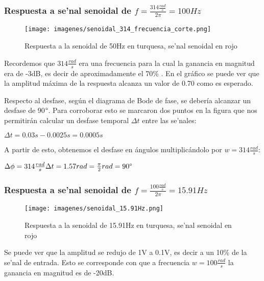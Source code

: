 \documentclass[12pt, titlepage]{article}
\begin{document}
    \newpage
    
    \subsubsection{Respuesta a se'nal senoidal de $f = \frac{314\frac{rad}{s}}{2\pi} = 100Hz$}
    
    \begin{figure}[!htb]
    \texttt{[image: imagenes/senoidal\_314\_frecuencia\_corte.png]}
    \centering
    \caption{Respuesta a la senoidal de 50Hz en turquesa, se'nal senoidal en rojo}
    \end{figure}
    
    Recordemos que $314\frac{rad}{s}$ era una frecuencia para la cual la ganancia en magnitud era de -3dB, es decir de aproximadamente el 70\% . En el gráfico se puede ver que la amplitud máxima de la respuesta alcanza un valor de 0.70 como es esperado.  
    
    Respecto al desfase, según el diagrama de Bode de fase, se debería alcanzar un desfase de 90$\degree$. Para corroborar esto se marcaron dos puntos en la figura que nos permitirán calcular un desfase temporal $\Delta t$ entre las se'nales:
    
    \begin{center}
        $\Delta t = 0.03s - 0.0025s = 0.0005s$
    \end{center}
    
    A partir de esto, obtenemos el desfase en ángulos multiplicándolo por $w = 314\frac{rad}{s}$:
    
    \begin{center}
        $\Delta\phi = 314\frac{rad}{s} \Delta t = 1.57rad = \frac{\pi}{2}rad=90\degree$
    \end{center}
    
    \newpage
    
    \subsubsection{Respuesta a se'nal senoidal de $f = \frac{100\frac{rad}{s}}{2\pi} = 15.91Hz$}
    
    \begin{figure}[!htb]
    \texttt{[image: imagenes/senoidal\_15.91Hz.png]}
    \centering
    \caption{Respuesta a la senoidal de 15.91Hz en turquesa, se'nal senoidal en rojo}
    \end{figure}
    
    Se puede ver que la amplitud se redujo de 1V a 0.1V, es decir a un 10\% de la se'nal de entrada. Esto se corresponde con que a frecuencia $w = 100\frac{rad}{s}$ la ganancia en magnitud es de -20dB.
    
\end{document}
